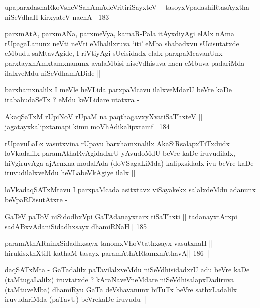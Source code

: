 \begin{shl}
upaparxdashaRkoV\s sheVSanAmAdeVritiriSayxteV ||
tasoyxVpadashiRtasAyxtha niSeVdhaH kirxyateV nacnA\hfill || 183 ||
\end{shl}

\begin{artha}
parxmAtA, parxmANa, parxmeVya, kamaR-Pala itAyxdiyAgi elAlx nAma
rUpagaLanunx neVti neVti eMbalilxruva `iti' eMba shabadxvu
sUcisutatxde eMbudu saMtavAgide, I riVtiyAgi sUcisidadx elalx
parxpaMcavanUnx parxtayxhAmxtamxnanunx avalaMbisi niseVdhisuva nacn
eMbuva padariMda ilalxveMdu niSeVdhamADide ||
\end{artha}

\begin{artha}
barxhamxnalilx I meVle heVLida parxpaMcavu ilalxveMdarU beVre kaDe
irabahudaSeTx ? eMdu keVLidare utatxra -
\end{artha}

\begin{shl}
AkaqSaTxM rUpiNoV rUpaM na paqthagavxyXvatiSaThxteV ||
jagatayxkalipxtamapi kimu moVhAdikalipxtamf\hfill || 184 ||
\end{shl}

\begin{artha}
rUpavuLaLx vasutxvina rUpavu barxhamxnalilx AkaSiRsalapxTiTxdudx
loVkadalilx paramAthaRvAgidadxrU yAvudoMdU beVre kaDe iruvudilalx,
hiVgiruvAga ajAcnxna modalAda (doVSagaLiMda) kalipxsidadx ivu beVre
kaDe iruvudilalxveMdu heVLabeVkAgiye ilalx ||
\end{artha}

\begin{artha}
loVkadaqSATxMtavu I parxpaMcada asitxtavx viSayakekx salalxdeMdu
adanunx beVpaRDisutAtxre -
\end{artha}

\begin{shl}
GaTeV paToV niSidodhxV\s pi GaTAdanayxtarx tiSaThxti ||
tadanayxtArxpi sadABxvAdaniSidadhxsayx dhamiRNaH\hfill || 185 ||
\end{shl}

\begin{shl}
paramAthARninxSidadhxsayx tanomxVhoVtathxsayx vasutxnaH ||
hirukisxthXtiH kathaM tasayx paramAthARtamxnA\s thavA\hfill || 186 ||
\end{shl}

\begin{artha}
daqSATxMta - GaTadalilx paTavilalxveMdu niSeVdhisidadxrU adu beVre
kaDe (taMtugaLalilx) iruvtatxde ?  kAraNaveVneMdare
niSeVdhisalapxDadiruva (taMtuveMba) dhamiRyu GaTa deVshavanunx biTuTx
beVre sathxLadalilx iruvudariMda (paTavU) beVrekaDe iruvudu ||
\end{artha}


